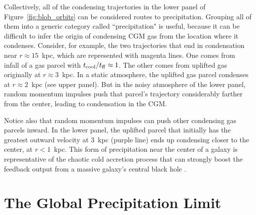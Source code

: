 \documentclass[twocolumn]{aastex63}
\begin{document}
Collectively, all of the condensing trajectories in the lower panel of Figure~\ref{fig:blob_orbits} can be considered routes to precipitation.  Grouping all of them into a generic category called ``precipitation" is useful, because it can be difficult to infer the origin of condensing CGM gas from the location where it condenses.  Consider, for example, the two trajectories that end in condensation near $r \approx 15$~kpc, which are represented with magenta lines.  One comes from infall of a gas parcel with $t_{\rm cool} / t_{\rm ff} \approx 1$.  The other comes from uplifted gas originally at $r \approx 3$~kpc.  In a static atmosphere, the uplifted gas parcel condenses at $r \approx 2$~kpc (see upper panel).  But in the noisy atmosphere of the lower panel, random momentum impulses push that parcel's trajectory considerably farther from the center, leading to condensation in the CGM.  

Notice also that random momentum impulses can push other condensing gas parcels inward. In the lower panel, the uplifted parcel that initially has the greatest outward velocity at 3~kpc (purple line) ends up condensing closer to the center, at $r < 1$~kpc.  This form of precipitation near the center of a galaxy is representative of the chaotic cold accretion process that can strongly boost the feedback output from a massive galaxy's central black hole \citep[e.g.,][]{ps05,Gaspari+2013MNRAS.432.3401G,Tremblay_2016Natur.534..218T}. 

\section{The Global Precipitation Limit}
\label{sec:tctff_pdf}
\end{document}
